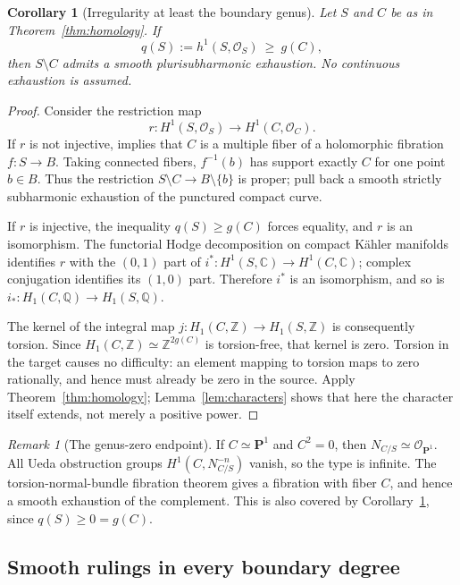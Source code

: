 \documentclass[11pt]{amsart}
\newtheorem{corollary}[theorem]{Corollary}
\theoremstyle{definition}
\theoremstyle{remark}
\newtheorem{remark}[theorem]{Remark}
\numberwithin{equation}{section}
\newcommand{\C}{\mathbb C}
\newcommand{\PP}{\mathbf P}
\newcommand{\OO}{\mathcal O}
\begin{document}
\begin{corollary}[Irregularity at least the boundary genus]\label{cor:irregularity}
Let $S$ and $C$ be as in Theorem~\ref{thm:homology}. If
\[
 q(S):=h^1(S,\OO_S)\ \ge\ g(C),
\]
then $S\setminus C$ admits a smooth plurisubharmonic exhaustion. No continuous exhaustion is assumed.
\end{corollary}
\begin{proof}
Consider the restriction map
\[
 r:H^1(S,\OO_S)\longrightarrow H^1(C,\OO_C).
\]
If $r$ is not injective, \cite[Proposition 2.7]{CLPT2018} implies that $C$ is a multiple
fiber of a holomorphic fibration $f:S\to B$. Taking connected fibers, $f^{-1}(b)$ has
support exactly $C$ for one point $b\in B$. Thus the restriction $S\setminus C\to
B\setminus\{b\}$ is proper; pull back a smooth strictly subharmonic exhaustion of the
punctured compact curve.

If $r$ is injective, the inequality $q(S)\ge g(C)$ forces equality, and $r$ is an
isomorphism. The functorial Hodge decomposition on compact K\"ahler manifolds identifies $r$
with the $(0,1)$ part of $i^*:H^1(S,\C)\to H^1(C,\C)$; complex conjugation identifies its
$(1,0)$ part. Therefore $i^*$ is an isomorphism, and so is $i_*:H_1(C,\mathbb Q)\to
H_1(S,\mathbb Q)$.

The kernel of the integral map $j:H_1(C,\mathbb Z)\to H_1(S,\mathbb Z)$ is consequently
torsion. Since $H_1(C,\mathbb Z)\simeq\mathbb Z^{2g(C)}$ is torsion-free, that kernel is
zero. Torsion in the target causes no difficulty: an element mapping to torsion maps to zero
rationally, and hence must already be zero in the source. Apply Theorem~\ref{thm:homology};
Lemma~\ref{lem:characters} shows that here the character itself extends, not merely a
positive power.
\end{proof}

\begin{remark}[The genus-zero endpoint]
If $C\simeq\PP^1$ and $C^2=0$, then $N_{C/S}\simeq\OO_{\PP^1}$. All Ueda obstruction groups
$H^1(C,N_{C/S}^{-n})$ vanish, so the type is infinite. The torsion-normal-bundle fibration
theorem gives a fibration with fiber $C$, and hence a smooth exhaustion of the complement.
This is also covered by Corollary~\ref{cor:irregularity}, since $q(S)\ge0=g(C)$.
\end{remark}

\subsection{Smooth rulings in every boundary degree}
\end{document}
